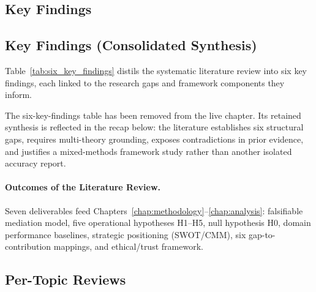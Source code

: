 \subsection{Key Findings}

\subsection{Key Findings (Consolidated Synthesis)}

\noindent Table~\ref{tab:six_key_findings} distils the systematic literature review into six key findings, each linked to the research gaps and framework components they inform.

\noindent The six-key-findings table has been removed from the live chapter. Its retained synthesis is reflected in the recap below: the literature establishes six structural gaps, requires multi-theory grounding, exposes contradictions in prior evidence, and justifies a mixed-methods framework study rather than another isolated accuracy report.

\paragraph{Outcomes of the Literature Review.}
Seven deliverables feed Chapters~\ref{chap:methodology}--\ref{chap:analysis}: falsifiable mediation model, five operational hypotheses H1--H5, null hypothesis H0, domain performance baselines, strategic positioning (SWOT/CMM), six gap-to-contribution mappings, and ethical/trust framework.




\subsection{Per-Topic Reviews}

